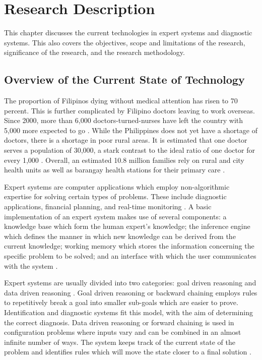 %
%
%                 

\chapter{Research Description}
\label{sec:researchdesc}    %
This chapter discusses the current technologies in expert systems and diagnostic systems.
This also covers the objectives, scope and limitations of the research, significance of the research, and the research methodology.

\section{Overview of the Current State of Technology}
\label{sec:overview}
The proportion of Filipinos dying without medical attention has risen to 70 percent.
This is further complicated by Filipino doctors leaving to work overseas.
Since 2000, more than 6,000 doctors-turned-nurses have left the country with 5,000 more expected to go \cite{Harden:2008}.
While the Philippines does not yet have a shortage of doctors, there is a shortage in poor rural areas.
It is estimated that one doctor serves a population of 30,000, a stark contrast to the ideal ratio of one doctor for every 1,000 \cite{Manongdo:2014}.
Overall, an estimated 10.8 million families rely on rural and city health units as well as barangay health stations for their primary care \cite{gmc:2013}.

Expert systems are computer applications which employ non-algorithmic expertise for solving certain types of problems.
 These include diagnostic applications, financial planning, and real-time monitoring \cite{Merritt:2010}.
A basic implementation of an expert system makes use of several components:
a knowledge base which form the human expert's knowledge; 
the inference engine which defines the manner in which new knowledge can be derived from the current knowledge; 
working memory which stores the information concerning the specific problem to be solved; 
and an interface with which the user communicates with the system \cite{Agarwal:2014}. 

Expert systems are usually divided into two categories: goal driven reasoning and data driven reasoning \cite{Merritt:2010}. 
Goal driven reasoning or backward chaining employs rules to repetitively break a goal into smaller sub-goals which are easier to prove. 
Identification and diagnostic systems fit this model, with the aim of determining the correct diagnosis. 
Data driven reasoning or forward chaining is used in configuration problems where inputs vary and can be combined in an almost infinite number of ways. 
The system keeps track of the current state of the problem and identifies rules which will move the state closer to a final solution .

